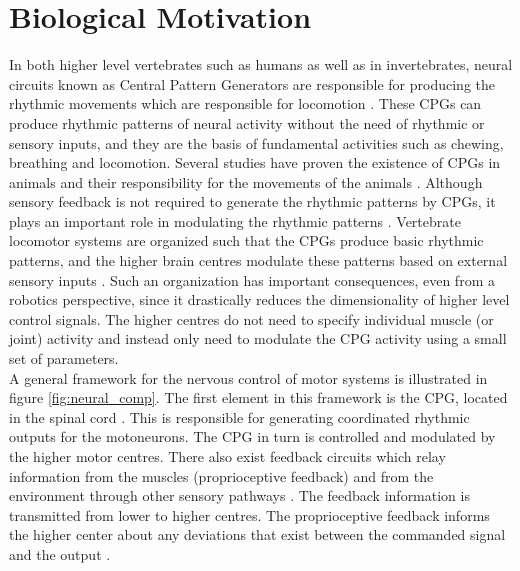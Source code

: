 \documentclass[12pt,twoside]{article}
\theoremstyle{plain}
\theoremstyle{definition}
\theoremstyle{remark}
\newcommand{\forceindent}{\leavevmode{\parindent=2em\indent}}
\begin{document}
\section{Biological Motivation}
\label{sec:Biological_Motivation}
In both higher level vertebrates such as humans as well as in invertebrates, neural circuits known as Central Pattern Generators are responsible for producing the rhythmic movements which are responsible for locomotion \cite{Ijspeert2008}. These CPGs can produce rhythmic patterns of neural activity without the need of rhythmic or sensory inputs, and they are the basis of fundamental activities such as chewing, breathing and locomotion. Several studies have proven the existence of CPGs in animals and their responsibility for the movements of the animals \cite{cohen1980neuronal,grillner1985neural,stein1999neurons}. Although sensory feedback is not required to generate the rhythmic patterns by CPGs, it plays an important role in modulating the rhythmic patterns \cite{Ijspeert2008}. Vertebrate locomotor systems are organized such that the CPGs produce basic rhythmic patterns, and the higher brain centres modulate these patterns based on external sensory inputs \cite{Ijspeert2008}. Such an organization has important consequences, even from a robotics perspective, since it drastically reduces the dimensionality of higher level control signals. The higher centres do not need to specify individual muscle (or joint) activity and instead only need to modulate the CPG activity using a small set of parameters.\\
\forceindent A general framework for the nervous control of motor systems is illustrated in figure \ref{fig:neural_comp}. The first element in this framework is the CPG, located in the spinal cord \cite{neurobiology1994shepherd}. This is responsible for generating coordinated rhythmic outputs for the motoneurons. The CPG in turn is controlled and modulated by the higher motor centres. There also exist feedback circuits which relay information from the muscles (proprioceptive feedback) and from the environment through other sensory pathways \cite{neurobiology1994shepherd}. The feedback information is transmitted from lower to higher centres. The proprioceptive feedback informs the higher center about any deviations that exist between the commanded signal and the output \cite{neurobiology1994shepherd}.
\end{document}
